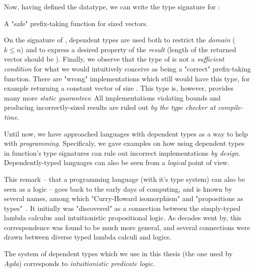             Now, having defined the   datatype, we can write the type signature for :
            \begin{listing}[h]
                \caption{A "safe" prefix-taking function for sized vectors. \label{lst:take-decl}}
            \end{listing}

            On the signature of , dependent types are used both to restrict the \emph{domain}
            ($ k \leq n $) and to express a desired property of the \emph{result}
            (length of the returned vector should be ).
            Finally, we observe that the type of  is not a \emph{sufficient condition} for
            what we would intuitively conceive as being a "correct" prefix-taking function.
            There are "wrong" implementations which still would have this type, for example
            returning a constant vector of size .
            This type is, however, provides many more \emph{static guarantees}:
            All implementations violating bounds and producing incorrectly-sized results
            are ruled out \emph{by the type checker at compile-time}.

            Until now, we have approached languages with dependent types as a way to help with \emph{programming}.
            Specificaly, we gave examples on how using dependent types in function's type signatures
            can rule out incorrect implementations \emph{by design}.
            Dependently-typed languages can also be seen from a \emph{logical} point of view.

            This remark -- that a programming language (with it's type system) can also be seen as a logic --
            goes back to the early days of computing, and is known by several names,
            among which "Curry-Howard isomorphism" and "propositions as types"~\cite{propositions-as-types}.
            It initially was "discovered" as a connection between the simply-typed lambda calculus
            and intuitionistic propositional logic.
            As decades went by, this correspondence was found to be much more general,
            and several connections were drawn between diverse typed lambda calculi and logics.

            The system of dependent types which we use in this thesis (the one used by \emph{Agda})
            corresponds to \emph{intuitionistic predicate logic}.


